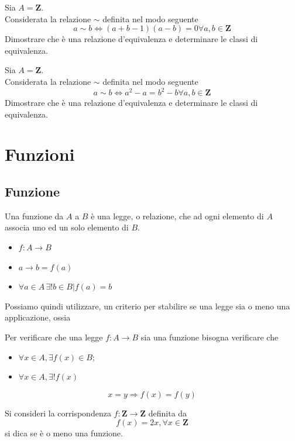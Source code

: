 \begin{flushleft}
\begin{esercizio}
Sia $A = \mathbf{Z}$.\\
Considerata la relazione $\sim$ definita nel modo seguente
\[a\sim b \Leftrightarrow (a+b-1)(a-b) = 0 \forall a,b \in \mathbf{Z}\]
Dimostrare che è una relazione d'equivalenza e determinare le classi di equivalenza.
\end{esercizio}
\vspace{200px}

\begin{esercizio}
Sia $A = \mathbf{Z}$.\\
Considerata la relazione $\sim$ definita nel modo seguente
\[a\sim b \Leftrightarrow a^2-a =b^2-b \forall a,b \in \mathbf{Z}\]
Dimostrare che è una relazione d'equivalenza e determinare le classi di equivalenza.
\end{esercizio}
\vspace{200px}


\section{Funzioni}
\subsection{Funzione}
Una funzione da $A$ a $B$ è una legge, o relazione, che ad ogni elemento di $A$ associa uno ed un solo elemento di $B$.
\begin{itemize}
    \item $f: A \rightarrow B$
    \item $a\rightarrow b = f(a)$
    \item $\forall a\in A\, \exists !b\in B|f(a) = b$
\end{itemize}
Possiamo quindi utilizzare, un criterio per stabilire se una legge sia o meno una applicazione, ossia
\begin{criterio}
Per verificare che una legge $f:A \to B$ sia una funzione bisogna verificare che
\begin{itemize}
    \item $\forall x \in A, \exists f(x) \in B$;
    \item $\forall x \in A, \exists ! f(x)$
\end{itemize}
\[x = y \Rightarrow f(x) = f(y)\]
\end{criterio}

\begin{esercizio}
Si consideri la corrispondenza $f:\mathbf{Z}\to \mathbf{Z}$ definita da
\[f(x) = 2x, \forall x\in \mathbf{Z}\]
si dica se è o meno una funzione.
\end{esercizio}
\vspace{150px}


\end{flushleft}
